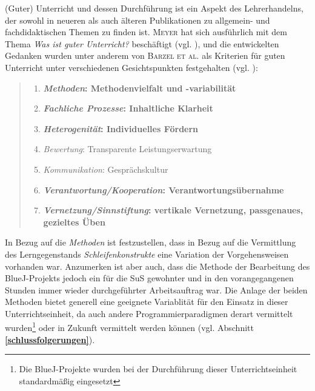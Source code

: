 \documentclass[paper=a4, DIV=13, BCOR=12mm, twoside=on, onecolumn=on, open = any, titlepage =on, parskip =half-, headsepline = on, footsepline = on, chapterprefix = on, sectionprefix = on, appendixprefix = off, fontsize = 12pt, numbers = noenddot, abstract = off]{scrreprt}
\begin{document}
(Guter) Unterricht und dessen Durchführung ist ein Aspekt des Lehrerhandelns, der sowohl in neueren als auch älteren Publikationen zu allgemein- und fachdidaktischen Themen zu finden ist. \textsc{Meyer} hat sich ausführlich mit dem Thema \emph{Was ist guter Unterricht?} beschäftigt (vgl. \cite{meyer:04}), und die entwickelten Gedanken wurden unter anderem von \textsc{Barzel et al.} als Kriterien für guten Unterricht unter verschiedenen Gesichtspunkten festgehalten (vgl. \cite[S.24f.]{barzel:16}):
\begin{quote}
\singlespacing
\begin{enumerate}
\item \textbf{\emph{Methoden}: Methodenvielfalt und -variabilität}
\item \textbf{\emph{Fachliche Prozesse}: Inhaltliche Klarheit}
\item \textbf{\emph{Heterogenität}: Individuelles Fördern}
\item \emph{Bewertung}: Transparente Leistungserwartung
\item \emph{Kommunikation}: Gesprächskultur
\item \textbf{\emph{Verantwortung/Kooperation}: Verantwortungsübernahme}
\item \textbf{\emph{Vernetzung/Sinnstiftung}: vertikale Vernetzung, passgenaues, gezieltes Üben}
\end{enumerate}
\end{quote}
\onehalfspacing

In Bezug auf die \emph{Methoden} ist festzustellen, dass in Bezug auf die Vermittlung des Lerngegenstands \emph{Schleifenkonstrukte} eine Variation der Vorgehensweisen vorhanden war. Anzumerken ist aber auch, dass die Methode der Bearbeitung des BlueJ-Projekts jedoch ein für die SuS gewohnter und in den vorangegangenen Stunden immer wieder durchgeführter Arbeitsauftrag war. Die Anlage der beiden Methoden bietet generell eine geeignete Variablität für den Einsatz in dieser Unterrichtseinheit, da auch andere Programmierparadigmen derart vermittelt wurden\footnote{Die BlueJ-Projekte wurden bei der Durchführung dieser Unterrichtseinheit standardmäßig eingesetzt} oder in Zukunft vermittelt werden können (vgl. Abschnitt \textbf{\ref{schlussfolgerungen}}).
\end{document}
